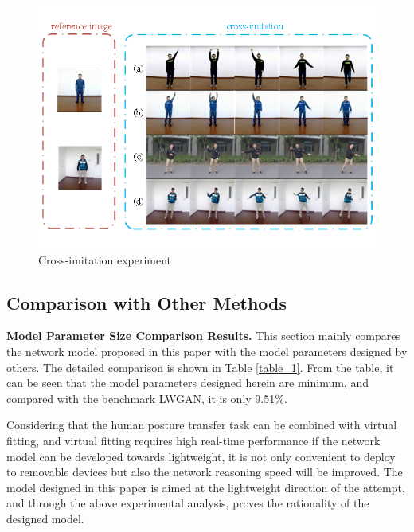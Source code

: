 	\begin{figure}
		\centering
		\includegraphics[scale=1]{image09.png}
		\caption{Cross-imitation experiment}
		\label{image09}
	\end{figure}
	
\subsection{Comparison with Other Methods}
	
\textbf{Model Parameter Size Comparison Results.} This section mainly compares the network model proposed in this paper with the model parameters designed by others. The detailed comparison is shown in Table \ref{table_1}. From the table, it can be seen that the model parameters designed herein are minimum, and compared with the benchmark LWGAN, it is only 9.51\%.
	
Considering that the human posture transfer task can be combined with virtual fitting, and virtual fitting requires high real-time performance if the network model can be developed towards lightweight, it is not only convenient to deploy to removable devices but also the network reasoning speed will be improved. The model designed in this paper is aimed at the lightweight direction of the attempt, and through the above experimental analysis, proves the rationality of the designed model.
	
